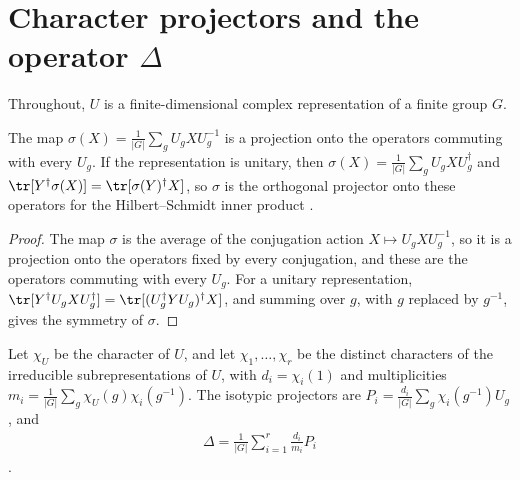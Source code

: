 \section{Character projectors and the operator \texorpdfstring{$\Delta$}{Delta}}
\label{sec:character_projectors}

Throughout, $U$ is a finite-dimensional complex representation of a finite
group $G$.

\begin{lemma}%
    \label{thm:peps_group_averaging}
    \leanok
    The map $\sigma(X)=\frac{1}{|G|}\sum_g U_gXU_g^{-1}$ is a projection onto
    the operators commuting with every $U_g$. If the representation is unitary,
    then $\sigma(X)=\frac{1}{|G|}\sum_g U_gXU_g^\dagger$ and
    $\tr[Y^\dagger\sigma(X)]=\tr[\sigma(Y)^\dagger X]$, so $\sigma$ is the
    orthogonal projector onto these operators for the Hilbert--Schmidt inner
    product \cite[Lemma~4.3]{Schuch2010PEPS}.
\end{lemma}

\begin{proof}\leanok
    The map $\sigma$ is the average of the conjugation action
    $X\mapsto U_gXU_g^{-1}$, so it is a projection onto the operators fixed
    by every conjugation, and these are the operators commuting with every
    $U_g$. For a unitary representation,
    $\tr[Y^\dagger U_gXU_g^\dagger]=\tr[(U_g^\dagger YU_g)^\dagger X]$, and
    summing over $g$, with $g$ replaced by $g^{-1}$, gives the symmetry of
    $\sigma$.
\end{proof}

\begin{definition}%
    \label{def:peps_delta_operator}
    \leanok
    Let $\chi_U$ be the character of $U$, and let $\chi_1,\dots,\chi_r$ be the
    distinct characters of the irreducible subrepresentations of $U$, with
    $d_i=\chi_i(1)$ and multiplicities
    $m_i=\frac{1}{|G|}\sum_g\chi_U(g)\chi_i(g^{-1})$. The isotypic projectors
    are $P_i=\frac{d_i}{|G|}\sum_g\chi_i(g^{-1})U_g$, and
    \begin{align*}
        \Delta=\frac{1}{|G|}\sum_{i=1}^{r}\frac{d_i}{m_i}P_i
    \end{align*}
    \cite[Lemma~4.4]{Schuch2010PEPS}.
\end{definition}

